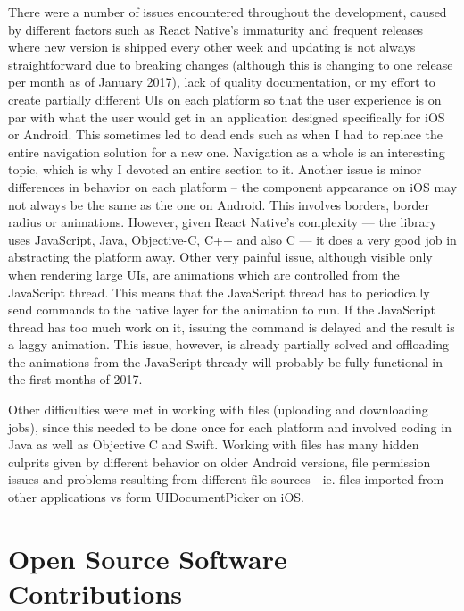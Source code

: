 There were a number of issues encountered throughout the development, caused by different factors such as React Native's immaturity and frequent releases where new version is shipped every other week and updating is not always straightforward due to breaking changes (although this is changing to one release per month as of January 2017), lack of quality documentation, or my effort to create partially different UIs on each platform so that the user experience is on par with what the user would get in an application designed specifically for iOS or Android. This sometimes led to dead ends such as when I had to replace the entire navigation solution for a new one. Navigation as a whole is an interesting topic, which is why I devoted an entire section to it.
Another issue is minor differences in behavior on each platform -- the component appearance on iOS may not always be the same as the one on Android. This involves borders, border radius or animations. However, given React Native's complexity --- the library uses JavaScript, Java, Objective-C, C++ and also C --- it does a very good job in abstracting the platform away.
Other very painful issue, although visible only when rendering large UIs, are animations which are controlled from the JavaScript thread. This means that the JavaScript thread has to periodically send commands to the native layer for the animation to run. If the JavaScript thread has too much work on it, issuing the command is delayed and the result is a laggy animation. This issue, however, is already partially solved and offloading the animations from the JavaScript thready will probably be fully functional in the first months of 2017.

Other difficulties were met in working with files (uploading and downloading jobs), since this needed to be done once for each platform and involved coding in Java as well as Objective C and Swift. Working with files has many hidden culprits given by different behavior on older Android versions, file permission issues and problems resulting from different file sources - ie. files imported from other applications vs form UIDocumentPicker on iOS.


\section{Open Source Software Contributions}

